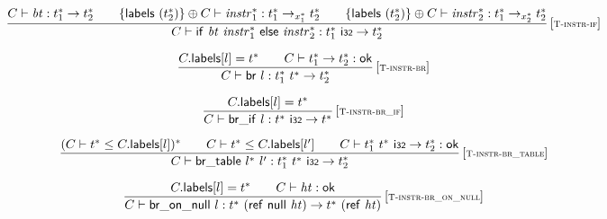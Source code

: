 $$
\begin{array}{@{}c@{}}\displaystyle
\frac{
C \vdash {\mathit{bt}} : {t_1^\ast} \rightarrow {t_2^\ast}
 \qquad
\{ \mathsf{labels}~({t_2^\ast}) \} \oplus C \vdash {{\mathit{instr}}_1^\ast} : {t_1^\ast} \rightarrow_{{x_1^\ast}} {t_2^\ast}
 \qquad
\{ \mathsf{labels}~({t_2^\ast}) \} \oplus C \vdash {{\mathit{instr}}_2^\ast} : {t_1^\ast} \rightarrow_{{x_2^\ast}} {t_2^\ast}
}{
C \vdash \mathsf{if}~{\mathit{bt}}~{{\mathit{instr}}_1^\ast}~\mathsf{else}~{{\mathit{instr}}_2^\ast} : {t_1^\ast}~\mathsf{i{\scriptstyle 32}} \rightarrow {t_2^\ast}
} \, {[\textsc{\scriptsize T{-}instr{-}if}]}
\qquad
\end{array}
$$

\vspace{1ex}

$$
\begin{array}{@{}c@{}}\displaystyle
\frac{
C{.}\mathsf{labels}{}[l] = {t^\ast}
 \qquad
C \vdash {t_1^\ast} \rightarrow {t_2^\ast} : \mathsf{ok}
}{
C \vdash \mathsf{br}~l : {t_1^\ast}~{t^\ast} \rightarrow {t_2^\ast}
} \, {[\textsc{\scriptsize T{-}instr{-}br}]}
\qquad
\end{array}
$$

$$
\begin{array}{@{}c@{}}\displaystyle
\frac{
C{.}\mathsf{labels}{}[l] = {t^\ast}
}{
C \vdash \mathsf{br\_if}~l : {t^\ast}~\mathsf{i{\scriptstyle 32}} \rightarrow {t^\ast}
} \, {[\textsc{\scriptsize T{-}instr{-}br\_if}]}
\qquad
\end{array}
$$

$$
\begin{array}{@{}c@{}}\displaystyle
\frac{
(C \vdash {t^\ast} \leq C{.}\mathsf{labels}{}[l])^\ast
 \qquad
C \vdash {t^\ast} \leq C{.}\mathsf{labels}{}[{l'}]
 \qquad
C \vdash {t_1^\ast}~{t^\ast}~\mathsf{i{\scriptstyle 32}} \rightarrow {t_2^\ast} : \mathsf{ok}
}{
C \vdash \mathsf{br\_table}~{l^\ast}~{l'} : {t_1^\ast}~{t^\ast}~\mathsf{i{\scriptstyle 32}} \rightarrow {t_2^\ast}
} \, {[\textsc{\scriptsize T{-}instr{-}br\_table}]}
\qquad
\end{array}
$$

$$
\begin{array}{@{}c@{}}\displaystyle
\frac{
C{.}\mathsf{labels}{}[l] = {t^\ast}
 \qquad
C \vdash {\mathit{ht}} : \mathsf{ok}
}{
C \vdash \mathsf{br\_on\_null}~l : {t^\ast}~(\mathsf{ref}~\mathsf{null}~{\mathit{ht}}) \rightarrow {t^\ast}~(\mathsf{ref}~{\mathit{ht}})
} \, {[\textsc{\scriptsize T{-}instr{-}br\_on\_null}]}
\qquad
\end{array}
$$

